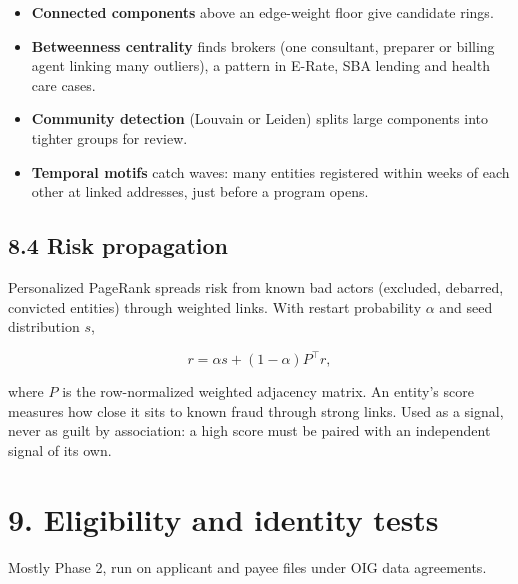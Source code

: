 \documentclass[letterpaper,11pt]{article}
\providecommand{\tightlist}{\setlength{\itemsep}{0pt}\setlength{\parskip}{0pt}}
\begin{document}
\begin{itemize}
\tightlist
\item
  \textbf{Connected components} above an edge-weight floor give
  candidate rings.
\item
  \textbf{Betweenness centrality} finds brokers (one consultant,
  preparer or billing agent linking many outliers), a pattern in E-Rate,
  SBA lending and health care cases.
\item
  \textbf{Community detection} (Louvain or Leiden) splits large
  components into tighter groups for review.
\item
  \textbf{Temporal motifs} catch waves: many entities registered within
  weeks of each other at linked addresses, just before a program opens.
\end{itemize}

\hypertarget{risk-propagation}{%
\subsection*{8.4 Risk propagation}\label{risk-propagation}}

Personalized PageRank spreads risk from known bad actors (excluded,
debarred, convicted entities) through weighted links. With restart
probability \(\alpha\) and seed distribution \(s\),

\[r = \alpha s + (1 - \alpha) P^{\top} r,\]

where \(P\) is the row-normalized weighted adjacency matrix. An entity's
score measures how close it sits to known fraud through strong links.
Used as a signal, never as guilt by association: a high score must be
paired with an independent signal of its own.

\hypertarget{eligibility-and-identity-tests}{%
\section*{9. Eligibility and identity
tests}\label{eligibility-and-identity-tests}}

Mostly Phase 2, run on applicant and payee files under OIG data
agreements.
\end{document}
